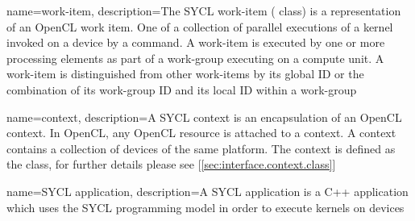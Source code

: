 {
  name={work-item},
  description={The SYCL work-item ( class) is a
               representation of an OpenCL work item. One of a collection of
               parallel executions of a kernel invoked on a \gls{device} by a
               command. A work-item is executed by one or more processing
               elements as part of a work-group executing on a compute unit. A
               work-item is distinguished from other work-items by its global ID
               or the combination of its work-group ID and its local ID within a
               work-group \cite{opencl12}}
}

{
  name={context},
  description={A SYCL context is an encapsulation of an OpenCL context. In OpenCL,
         any OpenCL resource is attached to a context. A context contains a
         collection of \glspl{device} of the same \gls{platform}. The context is
         defined as the  class, for further
               details please see [\ref{sec:interface.context.class}]}
}

{
  name={SYCL application},
  description={A SYCL application is a C++ application which uses the SYCL
         programming model in order to execute \glspl{kernel} on
         \glspl{device}}
}



